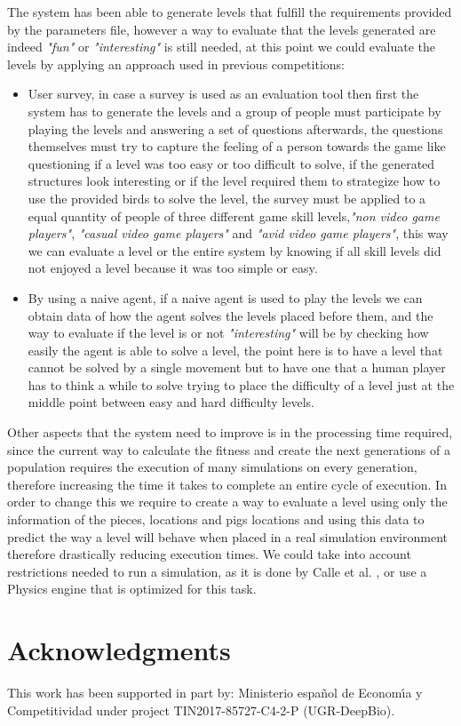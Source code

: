 \documentclass[conference]{IEEEtran}
\begin{document}
     The system has been able to generate levels that fulfill the requirements
     provided by the parameters file, however a way to evaluate that the levels
     generated are indeed \textit{"fun"} or \textit{"interesting"} is still
     needed, at this point we could evaluate the levels by applying an approach
     used in previous competitions:
     \begin{itemize}
        \item User survey, in case a survey is used as an evaluation tool then first
        the system has to generate the levels and a group of people must participate
        by playing the levels and answering a set of questions afterwards, the
        questions themselves must try to capture the feeling of a person towards the
        game like questioning if a level was too easy or too difficult to solve, if
        the generated structures look interesting or if the level required them to
        strategize how to use the provided birds to solve the level, the survey must
        be applied to a equal quantity of people of three different game skill
        levels,\textit{"non video game players"}, \textit{"casual video game
        players"} and \textit{"avid video game players"}, this way we can evaluate a
        level or the entire system by knowing if all skill levels did not enjoyed a
        level because it was too simple or easy.
        \item By using a naive agent, if a naive agent is used to play the levels we
        can obtain data of how the agent solves the levels placed before them, and
        the way to evaluate if the level is or not \textit{"interesting"} will be by
        checking how easily the agent is able to solve a level, the point here is
        to have a level that cannot be solved by a single movement but to have one
        that a human player has to think a while to solve trying to place the
        difficulty of a level just at the middle point between easy and hard
        difficulty levels.
    \end{itemize}
        
    Other aspects that the system need to improve is in the processing time
    required, since the current way to calculate the fitness and create the next
    generations of a population requires the execution of many 
    simulations on every generation, therefore increasing
    the time it takes to complete an entire cycle of execution. In order to
    change this we require to create a way to evaluate a level using only the
    information of the pieces, locations and pigs locations and using this data to
    predict the way a level will behave when placed in a real simulation environment
    therefore drastically reducing execution times. We could take into account restrictions 
    needed to run a simulation, as it is done by Calle et al. \cite{lauracalle}, 
    or use a Physics engine that is optimized for this task.



\section*{Acknowledgments}

This work has been supported in part by: Ministerio espa\~{n}ol de
Econom\'{\i}a y Competitividad under project TIN2017-85727-C4-2-P (UGR-DeepBio).




\end{document}
